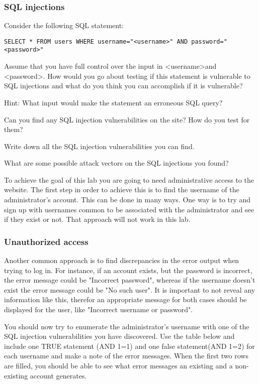 \documentclass[EITN41]{../tex/cryptosecuritylab}
\begin{document}
\subsubsection{SQL injections}

\bprepass
\item Consider the following SQL statement: 
\begin{verbatim} 
SELECT * FROM users WHERE username="<username>" AND password="<password>"
\end{verbatim}
Assume that you have full control over the input in \textless username\textgreater and \textless  password\textgreater. How would you go about testing if this statement is vulnerable to SQL injections and what do you think you can accomplish if it is vulnerable?

Hint: What input would make the statement an erroneous SQL query?
\eprepass

\bprob
\item Can you find any SQL injection vulnerabilities on the site? How do you test for them?
\item Write down all the SQL injection vulnerabilities you can find.
\item What are some possible attack vectors on the SQL injections you found?
\eprob

To achieve the goal of this lab you are going to need administrative access to the website. The first step in order to achieve this is to find the username of the administrator's account. This can be done in many ways. One way is to try and sign up with usernames common to be associated with the administrator and see if they exist or not. That approach will not work in this lab.

\subsubsection{Unauthorized access}

Another common approach is to find discrepancies in the error output when trying to log in. For instance, if an account exists, but the password is incorrect, the error message could be "Incorrect password", whereas if the username doesn't exist the error message could be "No such user". It is important to not reveal any information like this, therefor an appropriate message for both cases should be displayed for the user, like "Incorrect username or password".

You should now try to enumerate the administrator's username with one of the SQL injection vulnerabilities you have discovered. Use the table below and include one TRUE statement (AND 1=1) and one false statement(AND 1=2) for each username and make a note of the error messages. When the first two rows are filled, you should be able to see what error messages an existing and a non-existing account generates.
\end{document}
